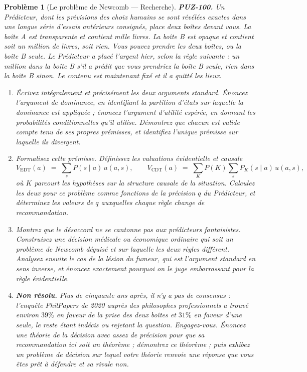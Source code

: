 \documentclass[11pt]{article}
\newtheorem{problem}{Problème}
\begin{document}
\begin{problem}[{Le problème de Newcomb --- Recherche}]
\textbf{PUZ-100.} Un Prédicteur, dont les prévisions des choix humains se sont révélées
exactes dans une longue série d'essais antérieurs consignés, place deux boîtes devant vous. La
boîte A est transparente et contient mille livres. La boîte B est opaque et contient soit un
million de livres, soit rien. Vous pouvez prendre les deux boîtes, ou la boîte B seule. Le
Prédicteur a placé l'argent hier, selon la règle suivante : un million dans la boîte B s'il a
prédit que vous prendriez la boîte B seule, rien dans la boîte B sinon. Le contenu est
maintenant fixé et il a quitté les lieux.
\begin{enumerate}
\item[(a)] Écrivez intégralement et précisément les deux arguments standard. Énoncez l'argument de
dominance, en identifiant la partition d'états sur laquelle la dominance est appliquée ;
énoncez l'argument d'utilité espérée, en donnant les probabilités conditionnelles qu'il
utilise. Démontrez que chacun est valide compte tenu de ses propres prémisses, et identifiez
l'unique prémisse sur laquelle ils divergent.
\item[(b)] Formalisez cette prémisse. Définissez les valuations évidentielle et causale
\[ V_{\mathrm{EDT}}(a) \;=\; \sum_{s} P(s \mid a)\, u(a,s), \qquad
 V_{\mathrm{CDT}}(a) \;=\; \sum_{K} P(K) \sum_{s} P_{K}(s \mid a)\, u(a,s), \]
où $ K $ parcourt les hypothèses sur la structure causale de la situation. Calculez les deux
pour ce problème comme fonctions de la précision $ q $ du Prédicteur, et déterminez les
valeurs de $ q $ auxquelles chaque règle change de recommandation.
\item[(c)] Montrez que le désaccord ne se cantonne pas aux prédicteurs fantaisistes. Construisez une
décision médicale ou économique ordinaire qui soit un problème de Newcomb déguisé et sur
laquelle les deux règles diffèrent. Analysez ensuite le cas de la lésion du fumeur, qui est
l'argument standard en sens inverse, et énoncez exactement pourquoi on le juge embarrassant
pour la règle évidentielle.
\item[(d)] \textbf{Non résolu.} Plus de cinquante ans après, il n'y a pas de consensus : l'enquête
PhilPapers de 2020 auprès des philosophes professionnels a trouvé environ $ 39\% $ en faveur
de la prise des deux boîtes et $ 31\% $ en faveur d'une seule, le reste étant indécis ou
rejetant la question. Engagez-vous. Énoncez une théorie de la décision avec assez de précision
pour que sa recommandation ici soit un théorème ; démontrez ce théorème ; puis exhibez un
problème de décision sur lequel votre théorie renvoie une réponse que vous êtes prêt à
défendre et sa rivale non.
\end{enumerate}

\end{problem}
\end{document}
